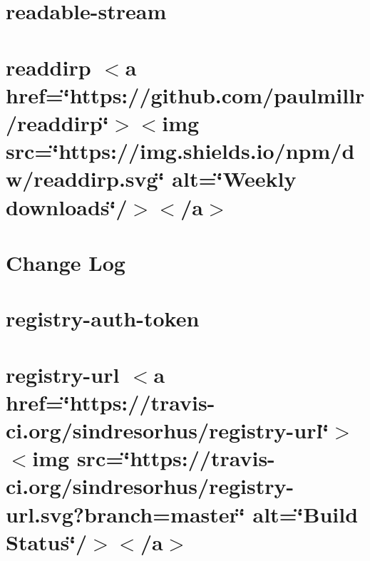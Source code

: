 \let\mypdfximage\pdfximage\def\pdfximage{\immediate\mypdfximage}\documentclass[twoside]{book}
\newcommand{\+}{\discretionary{\mbox{\scriptsize$\hookleftarrow$}}{}{}}
\begin{document}
\chapter{readable-\/stream}
\label{md__c_1__git_hub__p_r_o_y_e_c_t_o-_i_i_i-_g_o_t_rest-api_node_modules_readable-stream__r_e_a_d_m_e}

\chapter{readdirp $<$a href=\char`\"{}https\+://github.\+com/paulmillr/readdirp\char`\"{}$>$$<$img src=\char`\"{}https\+://img.\+shields.\+io/npm/dw/readdirp.\+svg\char`\"{} alt=\char`\"{}\+Weekly downloads\char`\"{}/$>$$<$/a$>$}
\label{md__c_1__git_hub__p_r_o_y_e_c_t_o-_i_i_i-_g_o_t_rest-api_node_modules_readdirp__r_e_a_d_m_e}

\chapter{Change Log}
\label{md__c_1__git_hub__p_r_o_y_e_c_t_o-_i_i_i-_g_o_t_rest-api_node_modules_registry-auth-token__c_h_a_n_g_e_l_o_g}

\chapter{registry-\/auth-\/token}
\label{md__c_1__git_hub__p_r_o_y_e_c_t_o-_i_i_i-_g_o_t_rest-api_node_modules_registry-auth-token__r_e_a_d_m_e}

\chapter{registry-\/url $<$a href=\char`\"{}https\+://travis-\/ci.\+org/sindresorhus/registry-\/url\char`\"{}$>$$<$img src=\char`\"{}https\+://travis-\/ci.\+org/sindresorhus/registry-\/url.\+svg?branch=master\char`\"{} alt=\char`\"{}\+Build Status\char`\"{}/$>$$<$/a$>$}
\label{md__c_1__git_hub__p_r_o_y_e_c_t_o-_i_i_i-_g_o_t_rest-api_node_modules_registry-url_readme}

\end{document}
